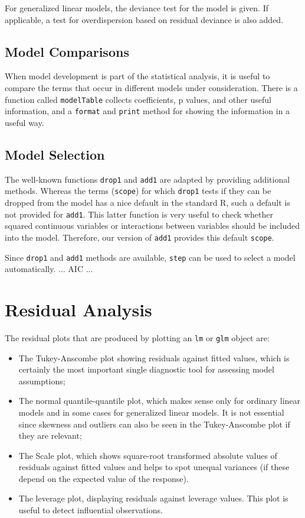 \documentclass{article}
\providecommand{\T}{\texttt}
\providecommand{\Vneed}[1]{\penalty-5000\vskip#1%
\penalty-5000\vspace{-#1}}
\begin{document}
For generalized linear models, the deviance test for the model is given.
If applicable, a test for overdispersion based on residual deviance is also
added. 

\subsection{Model Comparisons}
When model development is part of the statistical analysis, it is useful to
compare the terms that occur in different models under consideration.
There is a function called \T{modelTable} collects coefficients, p values,
and other useful information, and a \T{format} and \T{print} method for
showing the information in a useful way.

\subsection{Model Selection}
The well-known functions \T{drop1} and \T{add1} are adapted by 
providing additional methods. 
Whereas the terms (\T{scope}) for which \T{drop1} tests if they can be
dropped from the model has a nice default in the standard R, such a default
is not provided for \T{add1}. 
This latter function is very useful to check whether squared continuous
variables or interactions between variables should be included into the
model. Therefore, our version of \T{add1} provides this default \T{scope}. 

Since \T{drop1} and \T{add1} methods are available, \T{step} can be used to
select a model automatically.
... AIC ...

\Vneed{50mm}
\section{Residual Analysis}
The residual plots that are produced by plotting an \T{lm} or \T{glm}
object are: 
\begin{itemize}
\item 
The Tukey-Anscombe plot showing residuals against fitted values,
which is certainly the most important single diagnostic tool for assessing
model assumptions;
\item
The normal quantile-quantile plot, which makes sense only for ordinary
linear models and in some cases for generalized linear models. 
It is not essential since skewness and outliers can also be seen in the
Tukey-Anscombe plot if they are relevant;
\item
The Scale plot, which shows square-root transformed absolute values of
residuals against 
fitted values and helps to spot unequal variances (if these depend on the
expected value of the response).
\item
The leverage plot, displaying residuals against leverage values.
This plot is useful to detect influential observations.
\end{itemize}
\end{document}
